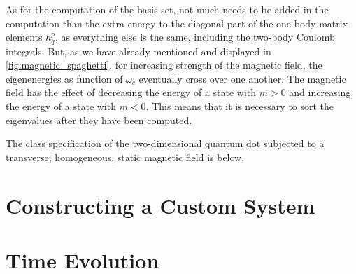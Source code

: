 As for the computation of the basis set, not much needs to be added in the computation 
than the extra energy to the diagonal part of the one-body matrix elements $h^p_q$, as 
everything else is the same, including the two-body Coulomb integrals. But, as we have 
already mentioned and displayed in \autoref{fig:magnetic_spaghetti}, for increasing 
strength of the magnetic field, the eigenenergies as function  of $\omega_c$ eventually 
cross over one another. The magnetic field has the effect of decreasing the energy of
a state with $m>0$ and increasing the energy of a state with $m<0$. This means that 
it is necessary to sort the eigenvalues after they have been computed. 

The class specification of the two-dimensional quantum dot subjected to a transverse,
homogeneous, static magnetic field is below.


\section{Constructing a Custom System}

\section{Time Evolution}

